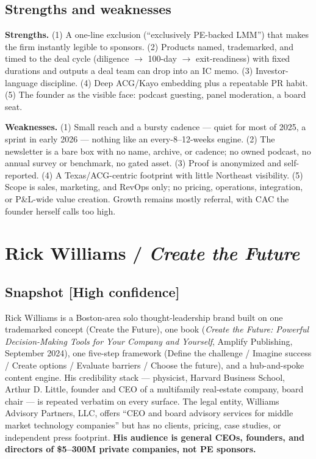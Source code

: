 \documentclass[11pt]{article}
\newcommand{\high}{\textcolor{green!45!black}{\textbf{[High confidence]}}}
\begin{document}
\subsection{Strengths and weaknesses}
\textbf{Strengths.} (1) A one-line exclusion (``exclusively PE-backed LMM'') that
makes the firm instantly legible to sponsors. (2) Products named, trademarked, and
timed to the deal cycle (diligence $\rightarrow$ 100-day $\rightarrow$ exit-readiness)
with fixed durations and outputs a deal team can drop into an IC memo. (3)
Investor-language discipline. (4) Deep ACG/Kayo embedding plus a repeatable PR habit.
(5) The founder as the visible face: podcast guesting, panel moderation, a board seat.

\textbf{Weaknesses.} (1) Small reach and a bursty cadence --- quiet for most of 2025,
a sprint in early 2026 --- nothing like an every-8--12-weeks engine. (2) The newsletter
is a bare box with no name, archive, or cadence; no owned podcast, no annual survey or
benchmark, no gated asset. (3) Proof is anonymized and self-reported. (4) A
Texas/ACG-centric footprint with little Northeast visibility. (5) Scope is sales,
marketing, and RevOps only; no pricing, operations, integration, or P\&L-wide value
creation. Growth remains mostly referral, with CAC the founder herself calls too high.

\section{Rick Williams / \emph{Create the Future}}

\subsection{Snapshot \high}
Rick Williams is a Boston-area solo thought-leadership brand built on one trademarked
concept (Create the Future\textregistered{}), one book (\emph{Create the Future: Powerful
Decision-Making Tools for Your Company and Yourself}, Amplify Publishing, September
2024), one five-step framework (Define the challenge / Imagine success / Create options
/ Evaluate barriers / Choose the future), and a hub-and-spoke content engine. His
credibility stack --- physicist, Harvard Business School, Arthur D. Little, founder and
CEO of a multifamily real-estate company, board chair --- is repeated verbatim on every
surface. The legal entity, Williams Advisory Partners, LLC, offers ``CEO and board
advisory services for middle market technology companies'' but has no clients,
pricing, case studies, or independent press footprint. \textbf{His audience is general
CEOs, founders, and directors of \$5--300M private companies, not PE sponsors.}
\end{document}
